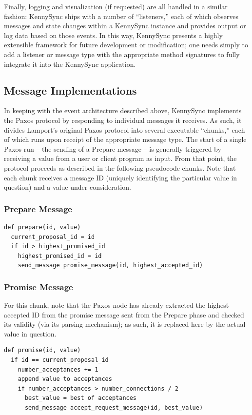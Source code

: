\documentclass{acm_proc_article-sp}
\begin{document}
Finally, logging and visualization (if requested) are all handled in a similar
fashion: KennySync ships with a number of ``listeners,'' each of which observes
messages and state changes within a KennySync instance and provides output or
log data based on those events. In this way, KennySync presents a highly
extensible framework for future development or modification; one needs simply to
add a listener or message type with the appropriate method signatures to fully
integrate it into the KennySync application.

\subsection{Message Implementations}

In keeping with the event architecture described above, KennySync implements the
Paxos protocol by responding to individual messages it receives. As such, it
divides Lamport's original Paxos protocol into several executable ``chunks,''
each of which runs upon receipt of the appropriate message type. The start of a
single Paxos run -- the sending of a Prepare message -- is generally triggered
by receiving a value from a user or client program as input. From that point,
the protocol proceeds as described in the following pseudocode chunks. Note that
each chunk receives a message ID (uniquely identifying the particular value in
question) and a value under consideration.

\subsubsection{Prepare Message}

\begin{verbatim}
def prepare(id, value)
  current_proposal_id = id
  if id > highest_promised_id
    highest_promised_id = id
    send_message promise_message(id, highest_accepted_id)
\end{verbatim}

\subsubsection{Promise Message}

For this chunk, note that the Paxos node has already extracted the highest
accepted ID from the promise message sent from the Prepare phase and checked its
validity (via its parsing mechanism); as such, it is replaced here by the actual
value in question.

\begin{verbatim}
def promise(id, value)
  if id == current_proposal_id
    number_acceptances += 1
    append value to acceptances
    if number_acceptances > number_connections / 2
      best_value = best of acceptances
      send_message accept_request_message(id, best_value)
\end{verbatim}
\end{document}
